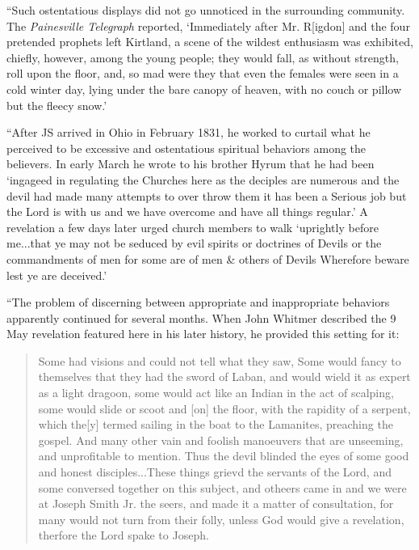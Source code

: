 			``Such ostentatious displays did not go unnoticed in the surrounding community. The \textit{Painesville Telegraph} reported, `Immediately after Mr. R[igdon] and the four pretended prophets left Kirtland, a scene of the wildest enthusiasm was exhibited, chiefly, however, among the young people; they would fall, as without strength, roll upon the floor, and, so mad were they that even the females were seen in a cold winter day, lying under the bare canopy of heaven, with no couch or pillow but the fleecy snow.'
			
			``After JS arrived in Ohio in February 1831, he worked to curtail what he perceived to be excessive and ostentatious spiritual behaviors among the believers. In early March he wrote to his brother Hyrum that he had been `ingageed in regulating the Churches here as the deciples are numerous and the devil had made many attempts to over throw them it has been a Serious job but the Lord is with us and we have overcome and have all things regular.' A revelation a few days later urged church members to walk `uprightly before me...that ye may not be seduced by evil spirits or doctrines of Devils or the commandments of men for some are of men \& others of Devils Wherefore beware lest ye are deceived.'
			
			``The problem of discerning between appropriate and inappropriate behaviors apparently continued for several months. When John Whitmer described the 9 May revelation featured here in his later history, he provided this setting for it:
			
			\begin{quote}
				Some had visions and could not tell what they saw, Some would fancy to themselves that they had the sword of Laban, and would wield it as expert as a light dragoon, some would act like an Indian in the act of scalping, some would slide or scoot and [on] the floor, with the rapidity of a serpent, which the[y] termed sailing in the boat to the Lamanites, preaching the gospel. And many other vain and foolish manoeuvers that are unseeming, and unprofitable to mention. Thus the devil blinded the eyes of some good and honest disciples...These things grievd the servants of the Lord, and some conversed together on this subject, and otheers came in and we were at Joseph Smith Jr. the seers, and made it a matter of consultation, for many would not turn from their folly, unless God would give a revelation, therfore the Lord spake to Joseph.
			\end{quote}
			
